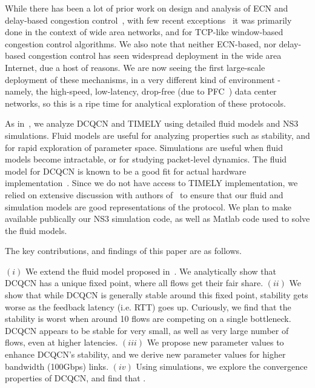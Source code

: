 
While there has been a lot of prior work on design and analysis of ECN and
delay-based congestion control~\cite{ecn, tcp-vegas, misra, xxx}, with few
recent exceptions~\cite{dctcp-analysis, qcn-analysis} it was primarily done in
the context of wide area networks, and for TCP-like window-based congestion
control algorithms.  We also note that neither ECN-based, nor delay-based
congestion control has seen widespread deployment in the wide area Internet, due
a host of reasons. We are now seeing the first large-scale deployment of these
mechanisms, in a very different kind of environment - namely, the high-speed,
low-latency, drop-free (due to PFC~\cite{pfc}) data center networks, so this is
a ripe time for analytical exploration of these protocols.


As in~\cite{dctcp-analysis, qcn-analysis}, we analyze DCQCN and TIMELY using
detailed fluid models and NS3 simulations. Fluid models are useful for analyzing
properties such as stability, and for rapid exploration of parameter space.
Simulations are useful when fluid models become intractable, or for studying
packet-level dynamics. The fluid model for DCQCN is known to be a good fit for
actual hardware implementation~\cite{dcqcn}. Since we do not have access to
TIMELY implementation, we relied on extensive discussion with authors
of~\cite{timely} to ensure that our fluid and simulation models are good
representations of the protocol. We plan to make available publically our NS3
simulation code, as well as Matlab code used to solve the fluid models.


The key contributions, and findings of this paper are as follows.

 $(i)$ We extend the fluid model proposed in~\cite{dcqcn}. We
analytically show that DCQCN has a unique fixed point, where all flows get their
fair share. $(ii)$ We show that while DCQCN is generally stable around this
fixed point, stability gets worse as the feedback latency (i.e. RTT) goes up.
Curiously, we find that the stability is worst when around 10 flows are
competing on a single bottleneck. DCQCN appears to be stable for very small, as
well as very large number of flows, even at higher latencies. $(iii)$ We propose
new parameter values to enhance DCQCN's stability, and we derive new parameter values
for higher bandwidth (100Gbps) links. $(iv)$ Using simulations, we explore the
convergence properties of DCQCN, and find that .


